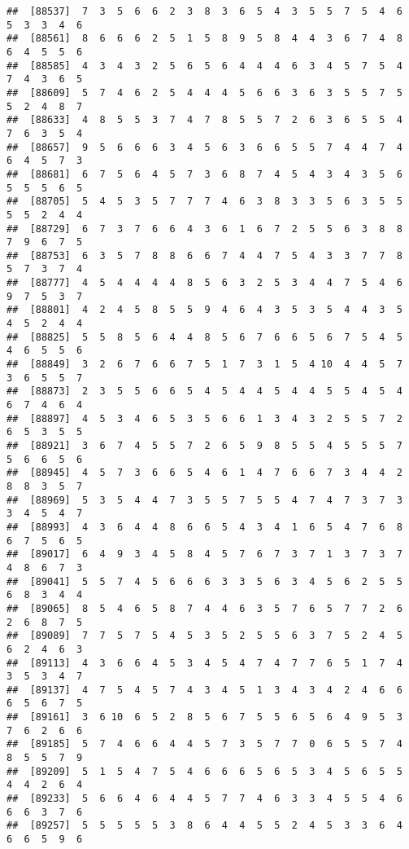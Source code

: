 \documentclass[
]{book}
\begin{document}
\begin{verbatim}
##  [88537]  7  3  5  6  6  2  3  8  3  6  5  4  3  5  5  7  5  4  6  5  3  3  4  6
##  [88561]  8  6  6  6  2  5  1  5  8  9  5  8  4  4  3  6  7  4  8  6  4  5  5  6
##  [88585]  4  3  4  3  2  5  6  5  6  4  4  4  6  3  4  5  7  5  4  7  4  3  6  5
##  [88609]  5  7  4  6  2  5  4  4  4  5  6  6  3  6  3  5  5  7  5  5  2  4  8  7
##  [88633]  4  8  5  5  3  7  4  7  8  5  5  7  2  6  3  6  5  5  4  7  6  3  5  4
##  [88657]  9  5  6  6  6  3  4  5  6  3  6  6  5  5  7  4  4  7  4  6  4  5  7  3
##  [88681]  6  7  5  6  4  5  7  3  6  8  7  4  5  4  3  4  3  5  6  5  5  5  6  5
##  [88705]  5  4  5  3  5  7  7  7  4  6  3  8  3  3  5  6  3  5  5  5  5  2  4  4
##  [88729]  6  7  3  7  6  6  4  3  6  1  6  7  2  5  5  6  3  8  8  7  9  6  7  5
##  [88753]  6  3  5  7  8  8  6  6  7  4  4  7  5  4  3  3  7  7  8  5  7  3  7  4
##  [88777]  4  5  4  4  4  4  8  5  6  3  2  5  3  4  4  7  5  4  6  9  7  5  3  7
##  [88801]  4  2  4  5  8  5  5  9  4  6  4  3  5  3  5  4  4  3  5  4  5  2  4  4
##  [88825]  5  5  8  5  6  4  4  8  5  6  7  6  6  5  6  7  5  4  5  4  6  5  5  6
##  [88849]  3  2  6  7  6  6  7  5  1  7  3  1  5  4 10  4  4  5  7  3  6  5  5  7
##  [88873]  2  3  5  5  6  6  5  4  5  4  4  5  4  4  5  5  4  5  4  6  7  4  6  4
##  [88897]  4  5  3  4  6  5  3  5  6  6  1  3  4  3  2  5  5  7  2  6  5  3  5  5
##  [88921]  3  6  7  4  5  5  7  2  6  5  9  8  5  5  4  5  5  5  7  5  6  6  5  6
##  [88945]  4  5  7  3  6  6  5  4  6  1  4  7  6  6  7  3  4  4  2  8  8  3  5  7
##  [88969]  5  3  5  4  4  7  3  5  5  7  5  5  4  7  4  7  3  7  3  3  4  5  4  7
##  [88993]  4  3  6  4  4  8  6  6  5  4  3  4  1  6  5  4  7  6  8  6  7  5  6  5
##  [89017]  6  4  9  3  4  5  8  4  5  7  6  7  3  7  1  3  7  3  7  4  8  6  7  3
##  [89041]  5  5  7  4  5  6  6  6  3  3  5  6  3  4  5  6  2  5  5  6  8  3  4  4
##  [89065]  8  5  4  6  5  8  7  4  4  6  3  5  7  6  5  7  7  2  6  2  6  8  7  5
##  [89089]  7  7  5  7  5  4  5  3  5  2  5  5  6  3  7  5  2  4  5  6  2  4  6  3
##  [89113]  4  3  6  6  4  5  3  4  5  4  7  4  7  7  6  5  1  7  4  3  5  3  4  7
##  [89137]  4  7  5  4  5  7  4  3  4  5  1  3  4  3  4  2  4  6  6  6  5  6  7  5
##  [89161]  3  6 10  6  5  2  8  5  6  7  5  5  6  5  6  4  9  5  3  7  6  2  6  6
##  [89185]  5  7  4  6  6  4  4  5  7  3  5  7  7  0  6  5  5  7  4  8  5  5  7  9
##  [89209]  5  1  5  4  7  5  4  6  6  6  5  6  5  3  4  5  6  5  5  4  4  2  6  4
##  [89233]  5  6  6  4  6  4  4  5  7  7  4  6  3  3  4  5  5  4  6  6  6  3  7  6
##  [89257]  5  5  5  5  5  3  8  6  4  4  5  5  2  4  5  3  3  6  4  6  6  5  9  6

\end{verbatim}
\end{document}
